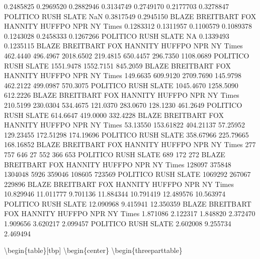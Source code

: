 \documentclass[english,,man]{apa6}
\begin{document}
0.2485825 0.2969520 0.2882946 0.3134749 0.2749170 0.2177703 0.3278847
POLITICO RUSH SLATE
NaN 0.3817549 0.2945150
BLAZE BREITBART FOX HANNITY HUFFPO NPR NY Times
0.1283312 0.1311957 0.1100579 0.1089378 0.1243028 0.2458333 0.1267266
POLITICO RUSH SLATE
NA 0.1339493 0.1235115
BLAZE BREITBART FOX HANNITY HUFFPO NPR NY Times
462.4440 496.4967 2018.6502 219.4815 650.4457 296.7350 1108.0689
POLITICO RUSH SLATE
1551.9478 1552.7151 845.2059
BLAZE BREITBART FOX HANNITY HUFFPO NPR NY Times
149.6635 609.9120 2709.7690 145.9798 462.2122 499.0987 570.3075
POLITICO RUSH SLATE
1045.4670 1258.5090 612.2226
BLAZE BREITBART FOX HANNITY HUFFPO NPR NY Times
210.5199 230.0304 534.4675 121.0370 283.0670 128.1230 461.2649
POLITICO RUSH SLATE
614.6647 419.0000 332.4228
BLAZE BREITBART FOX HANNITY HUFFPO NPR NY Times
53.13550 153.61822 404.21137 57.25952 129.23455 172.51298 174.19696
POLITICO RUSH SLATE
358.67966 225.79665 168.16852
BLAZE BREITBART FOX HANNITY HUFFPO NPR NY Times
277 757 646 27 552 366 653
POLITICO RUSH SLATE
689 172 272
BLAZE BREITBART FOX HANNITY HUFFPO NPR NY Times
128097 375848 1304048 5926 359046 108605 723569
POLITICO RUSH SLATE
1069292 267067 229896
BLAZE BREITBART FOX HANNITY HUFFPO NPR NY Times
10.829946 11.011777 9.701136 11.884344 10.791419 12.489576 10.563974
POLITICO RUSH SLATE
12.090968 9.415941 12.350359
BLAZE BREITBART FOX HANNITY HUFFPO NPR NY Times
1.871086 2.122317 1.848820 2.372470 1.909656 3.620217 2.099457
POLITICO RUSH SLATE
2.602008 9.255734 2.469494

\textbackslash{}begin\{table\}{[}tbp{]}
\textbackslash{}begin\{center\}
\textbackslash{}begin\{threeparttable\}

\caption{\label{tab:exp2sourcedescriptiveskav}}
\end{document}
